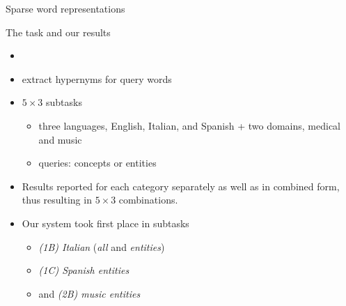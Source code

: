 \documentclass{beamer}
\newlength{\onecolwid}
\begin{document}
\begin{frame}[t]
\begin{columns}[t]
\begin{column}{\onecolwid}
\begin{block}{Sparse word representations}
\begin{itemize}

        \end{itemize}
      \end{block}

      \begin{block}{The task and our results}
        \begin{itemize}
          \item \cite{Camacho-Collados:2018} 
          \item extract hypernyms for query words 
          \item $5\times 3$ subtasks 
            \begin{itemize}
              \item three languages, English, Italian, and Spanish + 
                two domains, medical and music
              \item queries: concepts or entities
            \end{itemize}
          \item Results reported for each category separately as well as in
            combined form, thus resulting in $5\times 3$ combinations.  
          \item Our system took first place in subtasks 
            \begin{itemize}
              \item \emph{(1B) Italian} (\emph{all} and \emph{entities})
              \item \emph{(1C) Spanish entities}
              \item and \emph{(2B) music entities}
            \end{itemize}
        \end{itemize}
      \end{block}


\end{column}
\end{columns}
\end{frame}
\end{document}
